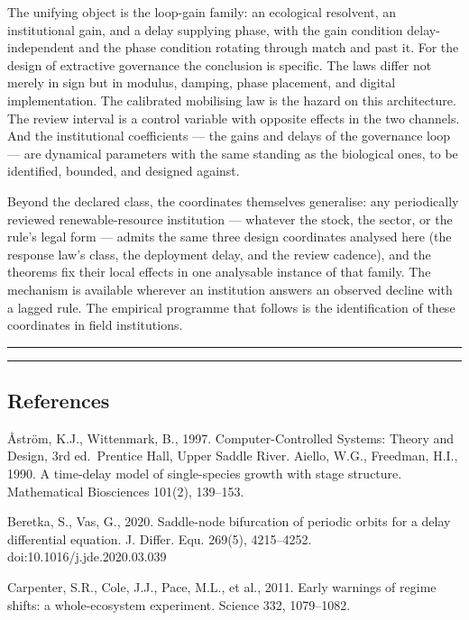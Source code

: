 \documentclass[11pt]{article}
\begin{document}
The unifying object is the loop-gain family: an ecological resolvent, an
institutional gain, and a delay supplying phase, with the gain condition
delay-independent and the phase condition rotating through match and
past it. For the design of extractive governance the conclusion is
specific. The laws differ not merely in sign but in modulus, damping,
phase placement, and digital implementation. The calibrated mobilising
law is the hazard on this architecture. The review interval is a control
variable with opposite effects in the two channels. And the
institutional coefficients --- the gains and delays of the governance
loop --- are dynamical parameters with the same standing as the
biological ones, to be identified, bounded, and designed against.

Beyond the declared class, the coordinates themselves generalise: any
periodically reviewed renewable-resource institution --- whatever the
stock, the sector, or the rule's legal form --- admits the same three
design coordinates analysed here (the response law's class, the
deployment delay, and the review cadence), and the theorems fix their
local effects in one analysable instance of that family. The mechanism
is available wherever an institution answers an observed decline with a
lagged rule. The empirical programme that follows is the identification
of these coordinates in field institutions.

\begin{center}\rule{0.5\linewidth}{0.5pt}\end{center}

\begin{center}\rule{0.5\linewidth}{0.5pt}\end{center}

\subsection{References}\label{references}

\AA{}str\"om, K.J., Wittenmark, B., 1997. Computer-Controlled Systems: Theory
and Design, 3rd ed.~Prentice Hall, Upper Saddle River. Aiello, W.G.,
Freedman, H.I., 1990. A time-delay model of single-species growth with
stage structure. Mathematical Biosciences 101(2), 139--153.

Beretka, S., Vas, G., 2020. Saddle-node bifurcation of periodic orbits
for a delay differential equation. J. Differ. Equ. 269(5), 4215--4252.
doi:10.1016/j.jde.2020.03.039

Carpenter, S.R., Cole, J.J., Pace, M.L., et al., 2011. Early warnings of
regime shifts: a whole-ecosystem experiment. Science 332, 1079--1082.
\end{document}
